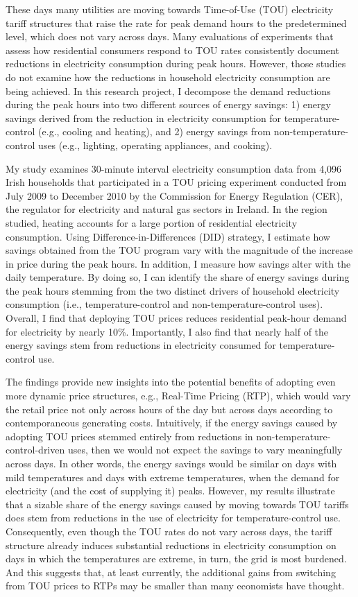 These days many utilities are moving towards Time-of-Use (TOU) electricity tariff structures that raise the rate for peak demand hours to the predetermined level, which does not vary across days. Many evaluations of experiments that assess how residential consumers respond to TOU rates consistently document reductions in electricity consumption during peak hours. However, those studies do not examine how the reductions in household electricity consumption are being achieved. In this research project, I decompose the demand reductions during the peak hours into two different sources of energy savings: 1) energy savings derived from the reduction in electricity consumption for temperature-control (e.g., cooling and heating), and 2) energy savings from non-temperature-control uses (e.g., lighting, operating appliances, and cooking). 

My study examines 30-minute interval electricity consumption data from 4,096 Irish households that participated in a TOU pricing experiment conducted from July 2009 to December 2010 by the Commission for Energy Regulation (CER), the regulator for electricity and natural gas sectors in Ireland. In the region studied, heating accounts for a large portion of residential electricity consumption. Using Difference-in-Differences (DID) strategy, I estimate how savings obtained from the TOU program vary with the magnitude of the increase in price during the peak hours. In addition, I measure how savings alter with the daily temperature. By doing so, I can identify the share of energy savings during the peak hours stemming from the two distinct drivers of household electricity consumption (i.e., temperature-control and non-temperature-control uses). Overall, I find that deploying TOU prices reduces residential peak-hour demand for electricity by nearly 10\%. Importantly, I also find that nearly half of the energy savings stem from reductions in electricity consumed for temperature-control use. 

The findings provide new insights into the potential benefits of adopting even more dynamic price structures, e.g., Real-Time Pricing (RTP), which would vary the retail price not only across hours of the day but across days according to contemporaneous generating costs. Intuitively, if the energy savings caused by adopting TOU prices stemmed entirely from reductions in non-temperature-control-driven uses, then we would not expect the savings to vary meaningfully across days. In other words, the energy savings would be similar on days with mild temperatures and days with extreme temperatures, when the demand for electricity (and the cost of supplying it) peaks. However, my results illustrate that a sizable share of the energy savings caused by moving towards TOU tariffs does stem from reductions in the use of electricity for temperature-control use. Consequently, even though the TOU rates do not vary across days, the tariff structure already induces substantial reductions in electricity consumption on days in which the temperatures are extreme, in turn, the grid is most burdened. And this suggests that, at least currently, the additional gains from switching from TOU prices to RTPs may be smaller than many economists have thought. 

